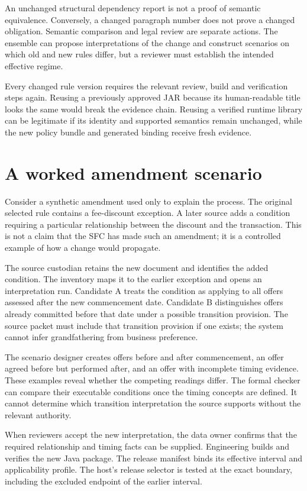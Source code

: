 An unchanged structural dependency report is not a proof of semantic equivalence.
Conversely, a changed paragraph number does not prove a changed obligation.
Semantic comparison and legal review are separate actions. The ensemble can
propose interpretations of the change and construct scenarios on which old and
new rules differ, but a reviewer must establish the intended effective regime.

Every changed rule version requires the relevant review, build and verification
steps again. Reusing a previously approved JAR because its human-readable title
looks the same would break the evidence chain. Reusing a verified runtime library
can be legitimate if its identity and supported semantics remain unchanged, while
the new policy bundle and generated binding receive fresh evidence.

\section{A worked amendment scenario}

Consider a synthetic amendment used only to explain the process. The original
selected rule contains a fee-discount exception. A later source adds a condition
requiring a particular relationship between the discount and the transaction.
This is not a claim that the SFC has made such an amendment; it is a controlled
example of how a change would propagate.

The source custodian retains the new document and identifies the added condition.
The inventory maps it to the earlier exception and opens an interpretation run.
Candidate A treats the condition as applying to all offers assessed after the
new commencement date. Candidate B distinguishes offers already committed before
that date under a possible transition provision. The source packet must include
that transition provision if one exists; the system cannot infer grandfathering
from business preference.

The scenario designer creates offers before and after commencement, an offer
agreed before but performed after, and an offer with incomplete timing evidence.
These examples reveal whether the competing readings differ. The formal checker
can compare their executable conditions once the timing concepts are defined.
It cannot determine which transition interpretation the source supports without
the relevant authority.

When reviewers accept the new interpretation, the data owner confirms that the
required relationship and timing facts can be supplied. Engineering builds and
verifies the new Java package. The release manifest binds its effective interval
and applicability profile. The host's release selector is tested at the exact
boundary, including the excluded endpoint of the earlier interval.

